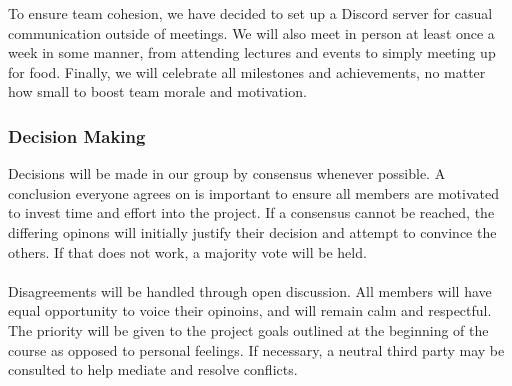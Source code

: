 \documentclass{article}
\begin{document}
To ensure team cohesion, we have decided to set up a Discord server for casual communication outside of meetings. We will also meet in person at least once a week in some manner, from attending lectures and events to simply meeting up for food. Finally, we will celebrate all milestones and achievements, no matter how small to boost team morale and motivation.

\subsubsection*{Decision Making} 

Decisions will be made in our group by consensus whenever possible. A conclusion everyone agrees on is important to ensure all members are motivated to invest time and effort into the project. If a consensus cannot be reached, the differing opinons will initially justify their decision and attempt to convince the others. If that does not work, a majority vote will be held.\\\\ Disagreements will be handled through open discussion. All members will have equal opportunity to voice their opinoins, and will remain calm and respectful. The priority will be given to the project goals outlined at the beginning of the course as opposed to personal feelings. If necessary, a neutral third party may be consulted to help mediate and resolve conflicts.
\end{document}
